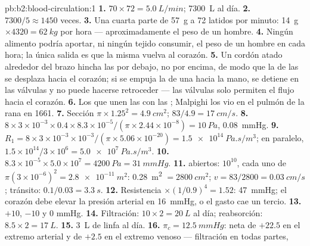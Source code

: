 \begin{solution}{pb:b2:blood-circulation:1}
\textbf{1.} $70\times 72 = \qty{5.0}{L/min}$; \qty{7300}{L} al día.
\textbf{2.} $7300/5 \approx 1450$ veces.
\textbf{3.} Una cuarta parte de \qty{57}{g} a 72 latidos por minuto:
\qty{14}{g}
$\times 4320 = \qty{62}{kg}$ por hora --- aproximadamente el peso de un
hombre.
\textbf{4.} Ningún alimento podría aportar, ni ningún tejido consumir, el
peso de un hombre en  cada hora; la única salida es que la misma
 vuelva al corazón.
\textbf{5.} Un cordón atado alrededor del brazo hincha las  por
debajo, no por encima, de modo que la  de las  se desplaza hacia
el corazón; si se empuja la  de una  hacia la mano, se detiene en
las válvulas y no puede hacerse retroceder --- las válvulas solo permiten
el flujo hacia el corazón.
\textbf{6.} Los  que unen las  con las ; Malpighi los
vio en el pulmón de la rana en 1661.
\textbf{7.} Sección $\pi\times 1.25^{2} = \qty{4.9}{cm^2}$; $83/4.9 =
\qty{17}{cm/s}$.
\textbf{8.} $8\times 3\times 10^{-3}\times 0.4\times 8.3\times
10^{-5}/(\pi\times 2.44\times 10^{-8}) = \qty{10}{Pa}$, \qty{0.08}{mmHg}.
\textbf{9.} $R_{1} = 8\times 3\times 10^{-3}\times 10^{-3}/(\pi\times
5.06\times 10^{-20}) = \qty{1.5e14}{Pa.s/m^3}$; en paralelo,
$1.5\times 10^{14}/3\times 10^{6} = \qty{5.0e7}{Pa.s/m^3}$.
\textbf{10.} $8.3\times 10^{-5}\times 5.0\times 10^{7} = \qty{4200}{Pa}
= \qty{31}{mmHg}$.
\textbf{11.}  abiertos: $10^{10}$, cada uno de $\pi(3\times 10^{-6})^{2}
= \qty{2.8e-11}{m^2}$: \qty{0.28}{m^2} $= \qty{2800}{cm^2}$; $v =
83/2800 = \qty{0.03}{cm/s}$; tránsito: $0.1/0.03 = \qty{3.3}{s}$.
\textbf{12.} Resistencia $\times(1/0.9)^{4} = 1.52$: \qty{47}{mmHg}; el
corazón debe elevar la presión arterial en \qty{16}{mmHg}, o el gasto cae
un tercio.
\textbf{13.} $+10$, $-10$ y $0$ mmHg.
\textbf{14.} Filtración: $10\times 2 = \qty{20}{L}$ al día; reabsorción:
$8.5\times 2 = \qty{17}{L}$.
\textbf{15.} \qty{3}{L} de linfa al día.
\textbf{16.} $\pi_c = \qty{12.5}{mmHg}$: neta de $+22.5$ en el extremo
arterial y de $+2.5$ en el extremo venoso --- filtración en todas partes,

\end{solution}
